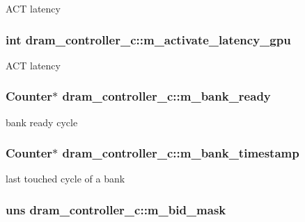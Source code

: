 \label{classdram__controller__c_abb28f2d1c7793e514a005a7bc15589d9}
ACT latency \hypertarget{classdram__controller__c_a835ddca91edbc43e049d625eff2207f8}{
\subsubsection[{m\_\-activate\_\-latency\_\-gpu}]{\setlength{\rightskip}{0pt plus 5cm}int {\bf dram\_\-controller\_\-c::m\_\-activate\_\-latency\_\-gpu}}}
\label{classdram__controller__c_a835ddca91edbc43e049d625eff2207f8}
ACT latency \hypertarget{classdram__controller__c_ad4f31c52a4c3858ae5fae007bc954c09}{
\subsubsection[{m\_\-bank\_\-ready}]{\setlength{\rightskip}{0pt plus 5cm}Counter$\ast$ {\bf dram\_\-controller\_\-c::m\_\-bank\_\-ready}}}
\label{classdram__controller__c_ad4f31c52a4c3858ae5fae007bc954c09}
bank ready cycle \hypertarget{classdram__controller__c_ab0c72ef77bc137b1ed16a060dd622c84}{
\subsubsection[{m\_\-bank\_\-timestamp}]{\setlength{\rightskip}{0pt plus 5cm}Counter$\ast$ {\bf dram\_\-controller\_\-c::m\_\-bank\_\-timestamp}}}
\label{classdram__controller__c_ab0c72ef77bc137b1ed16a060dd622c84}
last touched cycle of a bank \hypertarget{classdram__controller__c_a433a0c33c4b2075c99ac4f7d489ec66b}{
\subsubsection[{m\_\-bid\_\-mask}]{\setlength{\rightskip}{0pt plus 5cm}uns {\bf dram\_\-controller\_\-c::m\_\-bid\_\-mask}}}
